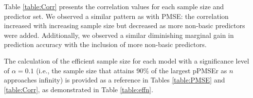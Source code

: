 Table \ref{table:Corr} presents the correlation values for each sample size and predictor set. We observed a similar pattern as with PMSE: the correlation increased with increasing sample size but decreased as more non-basic predictors were added. Additionally, we observed a similar diminishing marginal gain in prediction accuracy with the inclusion of more non-basic predictors.



The calculation of the efficient sample size for each model with a significance level of $\alpha = 0.1$ (i.e., the sample size that attains 90\% of the largest pPMSEr as $n$ approaches infinity) is provided as a reference in Tables \ref{table:PMSE} and \ref{table:Corr}, as demonstrated in Table \ref{table:effn}.


\begin{table}
\centering
{}
\caption{Efficient sample size $n^*$ by sequentially added predictors over the “basic” 3 predictors}
 \label{table:effn}
\end{table}


